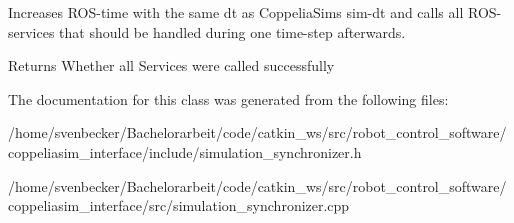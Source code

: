 Increases R\+O\+S-\/time with the same dt as Coppelia\+Sim\textquotesingle{}s \textquotesingle{}sim-\/dt\textquotesingle{} and calls all R\+O\+S-\/services that should be handled during one time-\/step afterwards. 

\begin{DoxyReturn}{Returns}
Whether all Services were called successfully 
\end{DoxyReturn}


The documentation for this class was generated from the following files\+:\begin{DoxyCompactItemize}
\item 
/home/svenbecker/\+Bachelorarbeit/code/catkin\+\_\+ws/src/robot\+\_\+control\+\_\+software/coppeliasim\+\_\+interface/include/simulation\+\_\+synchronizer.\+h\item 
/home/svenbecker/\+Bachelorarbeit/code/catkin\+\_\+ws/src/robot\+\_\+control\+\_\+software/coppeliasim\+\_\+interface/src/simulation\+\_\+synchronizer.\+cpp\end{DoxyCompactItemize}
